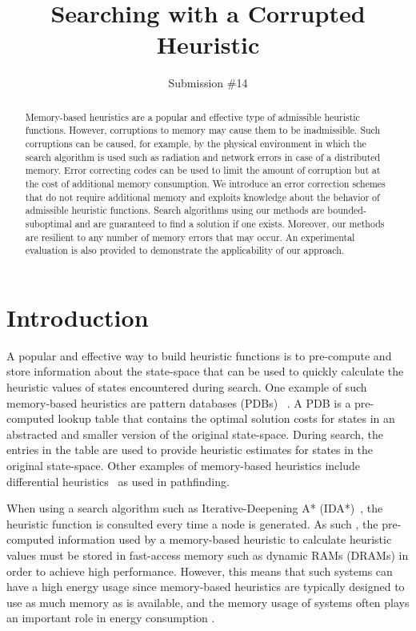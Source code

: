 \documentclass[letterpaper]{article}
\begin{document}
%
\title{Searching with a Corrupted Heuristic}
\author{Submission \#14}
\maketitle
\begin{abstract}
Memory-based heuristics are a popular and effective type of admissible heuristic functions. 
However, corruptions to memory may cause them to be inadmissible. Such corruptions can be caused, for example, by the physical environment in which the search algorithm is used such as radiation and network errors in case of a distributed memory. 
Error correcting codes can be used to limit the amount of corruption but at the cost of additional memory consumption. 
We introduce an error correction schemes that do not require additional memory and exploits knowledge about the behavior of admissible heuristic functions. 
Search algorithms using our methods are bounded-suboptimal and are guaranteed to find a solution if one exists. Moreover, our methods are resilient to any number of memory errors that may occur. An experimental evaluation is also provided to demonstrate the applicability of our approach. 
\end{abstract}

\section{Introduction}

A popular and effective way to build heuristic functions is to pre-compute and store information about the state-space that can be used to quickly calculate the heuristic values of states encountered during search. One example of such memory-based heuristics are pattern databases (PDBs) ~\cite{culberson1998patternDatabases,Edelkamp01planningwith}. A PDB is a pre-computed lookup table that contains the optimal solution costs for states in an abstracted and smaller version of the original state-space. During search, the entries in the table are used to provide heuristic estimates for states in the original state-space. Other examples of memory-based heuristics include differential heuristics~\cite{stutervant2009memoryBased} as used in pathfinding. %

When using a search algorithm such as Iterative-Deepening A* (IDA*)~\cite{korf85}, the heuristic function is consulted every time a node is generated. As such , the pre-computed information used by a memory-based heuristic to calculate heuristic values must be stored in fast-access memory such as dynamic RAMs (DRAMs) in order to achieve high performance. However, this means that such systems can have a high energy usage since memory-based heuristics are typically designed to use as much memory as is available, and the memory usage of systems often plays an important role in energy consumption \cite{5695550}.
\end{document}
